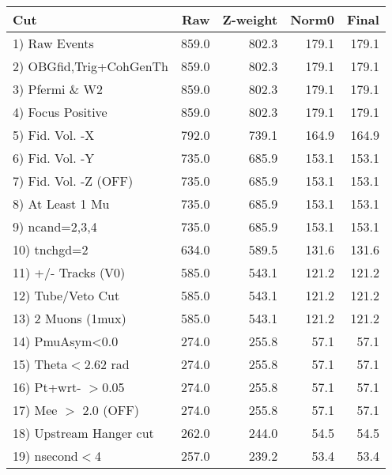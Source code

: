  \begin{table}[h!]\centering
 \begin{tabular}{||l||r|r|r|r||}
 \hline
 \hline
 Cut & Raw & Z-weight & Norm0 & Final \\
 \hline
  1) Raw Events           &       859.0 &       802.3 &       179.1 &       179.1 \\
  2) OBGfid,Trig+CohGenTh &       859.0 &       802.3 &       179.1 &       179.1 \\
  3) Pfermi \& W2         &       859.0 &       802.3 &       179.1 &       179.1 \\
  4) Focus Positive       &       859.0 &       802.3 &       179.1 &       179.1 \\
  5) Fid. Vol. -X         &       792.0 &       739.1 &       164.9 &       164.9 \\
  6) Fid. Vol. -Y         &       735.0 &       685.9 &       153.1 &       153.1 \\
  7) Fid. Vol. -Z (OFF)   &       735.0 &       685.9 &       153.1 &       153.1 \\
  8) At Least 1 Mu        &       735.0 &       685.9 &       153.1 &       153.1 \\
  9) ncand=2,3,4          &       735.0 &       685.9 &       153.1 &       153.1 \\
 10) tnchgd=2             &       634.0 &       589.5 &       131.6 &       131.6 \\
 11) +/- Tracks (V0)      &       585.0 &       543.1 &       121.2 &       121.2 \\
 12) Tube/Veto Cut        &       585.0 &       543.1 &       121.2 &       121.2 \\
 13) 2 Muons (1mux)       &       585.0 &       543.1 &       121.2 &       121.2 \\
 14) PmuAsym<0.0          &       274.0 &       255.8 &        57.1 &        57.1 \\
 15) Theta$<$2.62 rad     &       274.0 &       255.8 &        57.1 &        57.1 \\
 16) Pt+wrt- $>$0.05      &       274.0 &       255.8 &        57.1 &        57.1 \\
 17) Mee $>$ 2.0  (OFF)   &       274.0 &       255.8 &        57.1 &        57.1 \\
 18) Upstream Hanger cut  &       262.0 &       244.0 &        54.5 &        54.5 \\
 19) nsecond$<$4          &       257.0 &       239.2 &        53.4 &        53.4 \\

\end{tabular}
\end{table}
